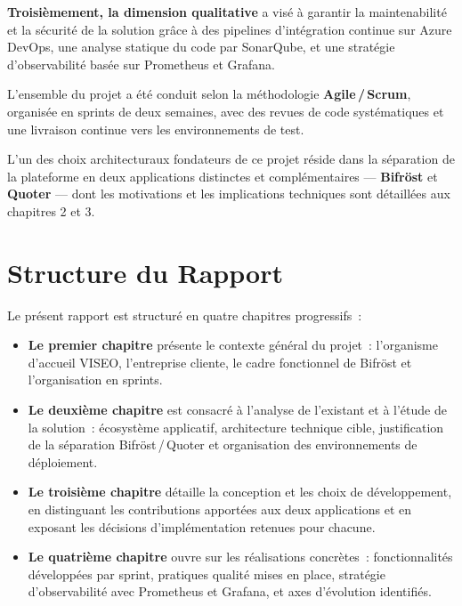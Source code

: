 \textbf{Troisi\`emement, la dimension qualitative} a vis\'e \`a garantir la maintenabilit\'e et la s\'ecurit\'e de la solution gr\^ace \`a des pipelines d'int\'egration continue sur Azure\,DevOps, une analyse statique du code par SonarQube, et une strat\'egie d'observabilit\'e bas\'ee sur Prometheus et Grafana.

L'ensemble du projet a \'et\'e conduit selon la m\'ethodologie \textbf{Agile\,/\,Scrum}, organis\'ee en sprints de deux semaines, avec des revues de code syst\'ematiques et une livraison continue vers les environnements de test.

\vspace{0.2cm}

L'un des choix architecturaux fondateurs de ce projet réside dans la séparation de la plateforme en deux applications distinctes et complémentaires — \textbf{Bifröst} et \textbf{Quoter} — dont les motivations et les implications techniques sont détaillées aux chapitres 2 et 3.\section*{Structure du Rapport}

Le pr\'esent rapport est structur\'e en quatre chapitres progressifs~:

\begin{itemize}
    \item \textbf{Le premier chapitre} pr\'esente le contexte g\'en\'eral du projet~: l'organisme d'accueil VISEO, l'entreprise cliente, le cadre fonctionnel de Bifr\"ost et l'organisation en sprints.

    \item \textbf{Le deuxi\`eme chapitre} est consacr\'e \`a l'analyse de l'existant et \`a l'\'etude de la solution~: \'ecosyst\`eme applicatif, architecture technique cible, justification de la s\'eparation Bifr\"ost\,/\,Quoter et organisation des environnements de d\'eploiement.

    \item \textbf{Le troisi\`eme chapitre} d\'etaille la conception et les choix de d\'eveloppement, en distinguant les contributions apport\'ees aux deux applications et en exposant les d\'ecisions d'impl\'ementation retenues pour chacune.

    \item \textbf{Le quatri\`eme chapitre} ouvre sur les r\'ealisations concr\`etes~: fonctionnalit\'es d\'evelopp\'ees par sprint, pratiques qualit\'e mises en place, strat\'egie d'observabilit\'e avec Prometheus et Grafana, et axes d'\'evolution identifi\'es.
\end{itemize}